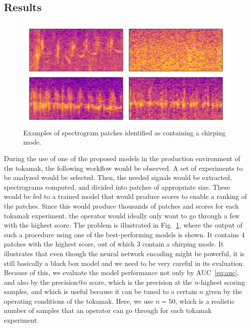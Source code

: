 \subsection{Results}
\begin{figure}
\begin{centering}
\includegraphics[scale=0.5]{data/chapter_alfven/anomalies.png}
\par
\end{centering}
\caption{Examples of spectrogram patches identified as containing a chirping
mode.}
\label{fig:alfven_patches}
\end{figure}

During the use of one of the proposed models in the production environment of the tokamak, the following workflow would be observed. A set of experiments to be analyzed would be selected. Then, the needed signals would be extracted, spectrograms computed, and divided into patches of appropriate size. These would be fed to a trained model that would produce scores to enable a ranking of the patches. Since this would produce thousands of patches and scores for each tokamak experiment, the operator would ideally only want to go through a few with the highest score. The problem is illustrated in Fig.~\ref{fig:alfven_patches}, where the output of such a procedure using one of the best-performing models is shown. It contains 4 patches with the highest score, out of which 3 contain a chirping mode. It illustrates that even though the neural network encoding might be powerful, it is still basically a black box model and we need to be very careful in its evaluation. Because of this, we evaluate the model performance not only by AUC~\eqref{eq:auc}, and also by the precision@$n$ score, which is the precision at the $n$-highest scoring samples, and which is useful because it can be tuned to a certain $n$ given by the operating conditions of the tokamak. Here, we use $n=50$, which is a realistic number of samples that an operator can go through for each tokamak experiment.

